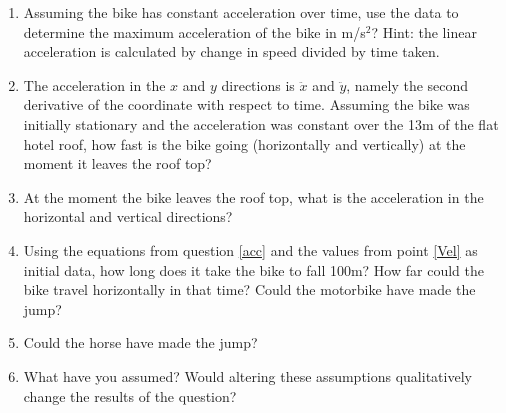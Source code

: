 \documentclass[10pt]{article}
\begin{document}
\begin{enumerate}
\item Assuming the bike has constant acceleration over time, use the data to determine the maximum acceleration of the bike in m/s$^2$? Hint: the linear acceleration is calculated by change in speed divided by time taken.
\item The acceleration in the $x$ and $y$ directions is $\ddot{x}$ and $\ddot{y}$, namely the second derivative of the coordinate with respect to time. Assuming the bike was initially stationary and the acceleration was constant over the 13m of the flat hotel roof, how fast is the bike going (horizontally and vertically) at the moment it leaves the roof top?\label{Vel}
\item At the moment the bike leaves the roof top, what is the acceleration in the horizontal and vertical directions? \label{acc}
\item Using the equations from question \ref{acc} and the values from point \ref{Vel} as initial data, how long does it take the bike to fall 100m? How far could the bike travel horizontally in that time? Could the motorbike have made the jump?
\item Could the horse have made the jump?
\item What have you assumed? Would altering these assumptions qualitatively change the results of the question?
\end{enumerate}
\end{document}
